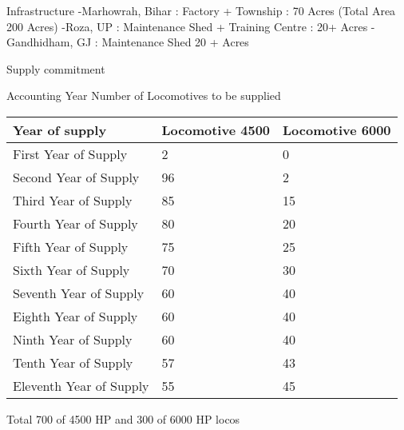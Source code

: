 \documentclass[
  ignorenonframetext,
]{beamer}
\begin{document}
\begin{frame}{Infrastructure}
\protect\hypertarget{infrastructure}{}
-Marhowrah, Bihar : Factory + Township : 70 Acres (Total Area 200 Acres)
-Roza, UP : Maintenance Shed + Training Centre : 20+ Acres -Gandhidham,
GJ : Maintenance Shed 20 + Acres
\end{frame}

\begin{frame}{Supply commitment}
\protect\hypertarget{supply-commitment}{}
\end{frame}

\begin{frame}{Accounting Year Number of Locomotives to be supplied}
\protect\hypertarget{accounting-year-number-of-locomotives-to-be-supplied}{}
\begin{longtable}[]{@{}lll@{}}
\toprule
Year of supply & Locomotive 4500 & Locomotive 6000 \\
\midrule
\endhead
First Year of Supply & 2 & 0 \\
Second Year of Supply & 96 & 2 \\
Third Year of Supply & 85 & 15 \\
Fourth Year of Supply & 80 & 20 \\
Fifth Year of Supply & 75 & 25 \\
Sixth Year of Supply & 70 & 30 \\
Seventh Year of Supply & 60 & 40 \\
Eighth Year of Supply & 60 & 40 \\
Ninth Year of Supply & 60 & 40 \\
Tenth Year of Supply & 57 & 43 \\
Eleventh Year of Supply & 55 & 45 \\
\bottomrule
\end{longtable}

Total 700 of 4500 HP and 300 of 6000 HP locos

\end{frame}
\end{document}
